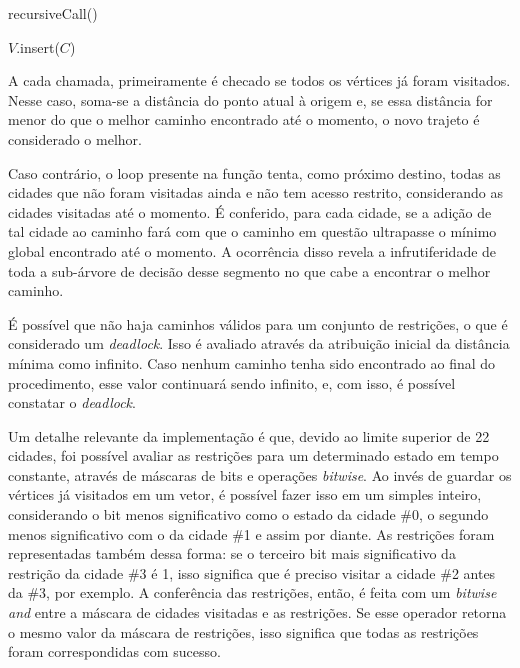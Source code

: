 \documentclass[10pt,a4paper]{article}
\numberwithin{equation}{section}
\begin{document}
\begin{function}[H]
    \DontPrintSemicolon
    \caption{recursiveCall()}

    \BlankLine

    $V$.insert($C$)\;


\end{function}

A cada chamada, primeiramente é checado se todos os vértices já foram visitados. Nesse caso, soma-se a distância do ponto atual à origem e, se essa distância for menor do que o melhor caminho encontrado até o momento, o novo trajeto é considerado o melhor.

Caso contrário, o loop presente na função tenta, como próximo destino, todas as cidades que não foram visitadas ainda e não tem acesso restrito, considerando as cidades visitadas até o momento. É conferido, para cada cidade, se a adição de tal cidade ao caminho fará com que o caminho em questão ultrapasse o mínimo global encontrado até o momento. A ocorrência disso revela a infrutiferidade de toda a sub-árvore de decisão desse segmento no que cabe a encontrar o melhor caminho.

É possível que não haja caminhos válidos para um conjunto de restrições, o que é considerado um \emph{deadlock}. Isso é avaliado através da atribuição inicial da distância mínima como infinito. Caso nenhum caminho tenha sido encontrado ao final do procedimento, esse valor continuará sendo infinito, e, com isso, é possível constatar o \emph{deadlock}.

Um detalhe relevante da implementação é que, devido ao limite superior de 22 cidades, foi possível avaliar as restrições para um determinado estado em tempo constante, através de máscaras de bits e operações \emph{bitwise}. Ao invés de guardar os vértices já visitados em um vetor, é possível fazer isso em um simples inteiro, considerando o bit menos significativo como o estado da cidade \#0, o segundo menos significativo com o da cidade \#1 e assim por diante. As restrições foram representadas também dessa forma: se o terceiro bit mais significativo da restrição da cidade \#3 é 1, isso significa que é preciso visitar a cidade \#2 antes da \#3, por exemplo. A conferência das restrições, então, é feita com um \emph{bitwise and} entre a máscara de cidades visitadas e as restrições. Se esse operador retorna o mesmo valor da máscara de restrições, isso significa que todas as restrições foram correspondidas com sucesso.
\end{document}
